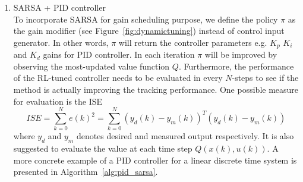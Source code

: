 \begin{enumerate}
	\item \ac{SARSA} + \ac{PID} controller \\
	To incorporate \ac{SARSA} for gain scheduling purpose, we define the policy $\pi$ as the gain modifier (see Figure~\ref{fig:dynamictuning}) instead of control input generator. In other words, $\pi$ will return the controller parameters e.g. $ K_p $ $ K_i $ and $ K_d $ gains for \ac{PID} controller. In each iteration $\pi$ will be improved by observing the most-updated value function $Q$. Furthermore, the performance of the \ac {RL}-tuned controller needs to be evaluated in every $ N $-steps to see if the method is actually improving the tracking performance. One possible measure for evaluation is the \ac {ISE}
	\begin{equation}
	ISE = \sum_{k=0}^{N}e(k)^2 = \sum_{k=0}^{N}(y_d(k) - y_m(k))^T(y_d(k) - y_m(k))
	\end{equation}
	where $y_d$ and $y_m$ denotes desired and measured output respectively. It is also suggested to evaluate the value at each time step $Q(x(k), u(k))$. A more concrete example of a \ac{PID} controller for a linear discrete time system is presented in Algorithm~\ref{alg:pid_sarsa}.
	

\end{enumerate}
